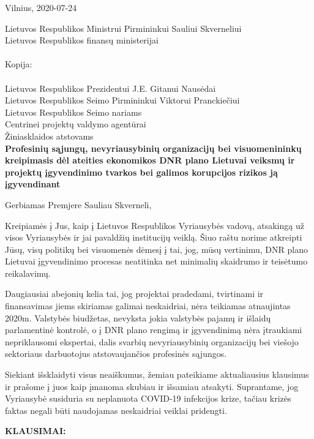 \documentclass[12pt]{letter}
\begin{document}
\begin{flushright}
Vilnius, 2020-07-24
\end{flushright}



Lietuvos Respublikos Ministrui Pirmininkui Sauliui Skverneliui\\
Lietuvos Respublikos finansų ministerijai\\
\\
Kopija:\\
\\
Lietuvos Respublikos Prezidentui J.E. Gitanui Nausėdai\\        
Lietuvos Respublikos Seimo Pirmininkui Viktorui Pranckiečiui\\ 
Lietuvos Respublikos Seimo nariams\\
Centrinei projektų valdymo agentūrai\\
Žiniasklaidos atstovams\\

\textbf{Profesinių sąjungų, nevyriausybinių organizacijų bei visuomenininkų kreipimasis dėl ateities ekonomikos DNR plano  Lietuvai veiksmų ir projektų įgyvendinimo tvarkos bei galimos korupcijos rizikos ją įgyvendinant}

Gerbiamas Premjere Sauliau Skverneli,

Kreipiamės į Jus, kaip į Lietuvos Respublikos Vyriausybės vadovą, atsakingą už visos Vyriausybės ir jai pavaldžių institucijų veiklą. Šiuo raštu norime atkreipti Jūsų, visų politikų bei visuomenės dėmesį į tai, jog, mūsų vertinimu, DNR plano Lietuvai įgyvendinimo procesas neatitinka net minimalių skaidrumo ir teisėtumo reikalavimų.

Daugiausiai abejonių kelia tai, jog projektai pradedami, tvirtinami ir finansavimas jiems skiriamas galimai neskaidriai, nėra teikiamas atnaujintas 2020m. Valstybės biudžetas, nevyksta jokia valstybės pajamų ir išlaidų parlamentinė kontrolė, o į DNR plano rengimą ir įgyvendinimą nėra įtraukiami nepriklausomi ekspertai, dalis svarbių nevyriausybinių organizacijų bei viešojo sektoriaus darbuotojus atstovaujančios profesinės sąjungos.

Siekiant išsklaidyti visus neaiškumus, žemiau pateikiame aktualiausius klausimus ir prašome į juos kaip įmanoma skubiau ir išsamiau atsakyti. Suprantame, jog Vyriausybė susiduria su neplanuota COVID-19 infekcijos krize, tačiau krizės faktas negali būti naudojamas neskaidriai veiklai pridengti.



\textbf{KLAUSIMAI:}
\end{document}
